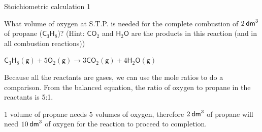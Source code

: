 \label{m38712*secfhsst!!!underscore!!!id1903}\vspace{-2cm}  
      \begin{wex}{Stoichiometric calculation 1 }
{

      \label{m38712*probfhsst!!!underscore!!!id1904}
      \label{m38712*id275479}What volume of oxygen at S.T.P. is needed for the complete combustion of $2\phantom{\rule{2pt}{0ex}}{\mathsf{dm}}^{3}$ of propane ($\mathsf{C}{}_{3}\mathsf{H}{}_{8}$)? (Hint: $\mathsf{CO}{}_{2}$ and $\mathsf{H}{}_{2}\mathsf{O}$ are the products in this reaction (and in all combustion reactions))
      \vspace{5pt}}
{
      \label{m38712*id284189}${\mathsf{C}}_{3}{\mathsf{H}}_{8}\left(\mathsf{g}\right)+5{\mathsf{O}}_{2}\left(\mathsf{g}\right)\to 3\mathsf{C}{\mathsf{O}}_{2}\left(\mathsf{g}\right)+4{\mathsf{H}}_{2}\mathsf{O}\left(\mathsf{g}\right)$
       
      \label{m38712*id284294}Because all the reactants are gases, we can use the mole ratios to do a comparison. From the balanced equation, the ratio of oxygen to propane in the reactants is 5:1.\par 
      \label{m38712*id284304}1 volume of propane needs 5 volumes of oxygen, therefore $2\phantom{\rule{2pt}{0ex}}{\mathsf{dm}}^{3}$ of propane will need $10\phantom{\rule{2pt}{0ex}}{\mathsf{dm}}^{3}$ of oxygen for the reaction to proceed to completion. 
}
    \end{wex}
    \noindent
\label{m38712*secfhsst!!!underscore!!!id1972}\vspace{-2cm} 
